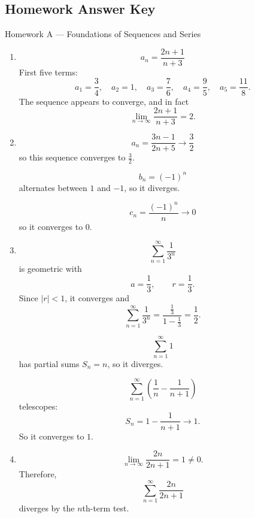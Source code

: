 \documentclass[11pt]{article}
\begin{document}
\newpage
\newpage
\subsection{Homework Answer Key}

\begin{theorybox}{Homework A --- Foundations of Sequences and Series}
\begin{enumerate}
    \item
    \[
    a_n=\frac{2n+1}{n+3}
    \]
    First five terms:
    \[
    a_1=\frac34,\quad
    a_2=1,\quad
    a_3=\frac76,\quad
    a_4=\frac95,\quad
    a_5=\frac{11}{8}.
    \]
    The sequence appears to converge, and in fact
    \[
    \lim_{n\to\infty}\frac{2n+1}{n+3}=2.
    \]

    \item
    \[
    a_n=\frac{3n-1}{2n+5}\to \frac32
    \]
    so this sequence converges to \(\frac32\).

    \[
    b_n=(-1)^n
    \]
    alternates between \(1\) and \(-1\), so it diverges.

    \[
    c_n=\frac{(-1)^n}{n}\to 0
    \]
    so it converges to \(0\).

    \item
    \[
    \sum_{n=1}^{\infty}\frac{1}{3^n}
    \]
    is geometric with
    \[
    a=\frac13,\qquad r=\frac13.
    \]
    Since \(|r|<1\), it converges and
    \[
    \sum_{n=1}^{\infty}\frac{1}{3^n}
    =
    \frac{\frac13}{1-\frac13}
    =
    \frac12.
    \]

    \[
    \sum_{n=1}^{\infty}1
    \]
    has partial sums \(S_n=n\), so it diverges.

    \[
    \sum_{n=1}^{\infty}\left(\frac1n-\frac1{n+1}\right)
    \]
    telescopes:
    \[
    S_n=1-\frac1{n+1}\to 1.
    \]
    So it converges to \(1\).

    \item
    \[
    \lim_{n\to\infty}\frac{2n}{2n+1}=1\neq 0.
    \]
    Therefore,
    \[
    \sum_{n=1}^{\infty}\frac{2n}{2n+1}
    \]
    diverges by the \(n\)th-term test.
\end{enumerate}
\end{theorybox}
\end{document}
